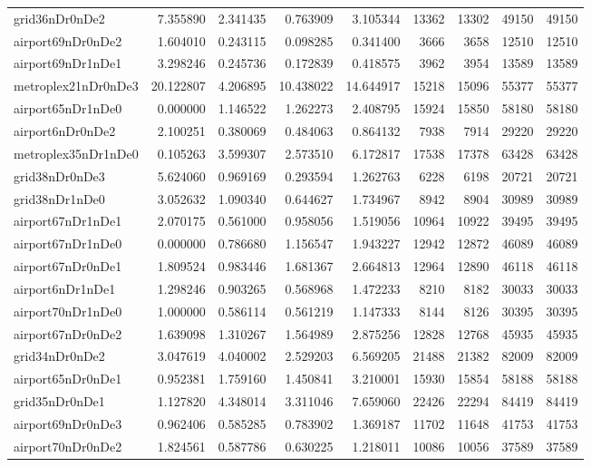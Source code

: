 \begin{longtable}{|l|r|r|r|r|r|r|r|r|}
grid36nDr0nDe2 & 7.355890 & 2.341435 & 0.763909 & 3.105344 & 13362 & 13302 & 49150 & 49150 \\
airport69nDr0nDe2 & 1.604010 & 0.243115 & 0.098285 & 0.341400 & 3666 & 3658 & 12510 & 12510 \\
airport69nDr1nDe1 & 3.298246 & 0.245736 & 0.172839 & 0.418575 & 3962 & 3954 & 13589 & 13589 \\
metroplex21nDr0nDe3 & 20.122807 & 4.206895 & 10.438022 & 14.644917 & 15218 & 15096 & 55377 & 55377 \\
airport65nDr1nDe0 & 0.000000 & 1.146522 & 1.262273 & 2.408795 & 15924 & 15850 & 58180 & 58180 \\
airport6nDr0nDe2 & 2.100251 & 0.380069 & 0.484063 & 0.864132 & 7938 & 7914 & 29220 & 29220 \\
metroplex35nDr1nDe0 & 0.105263 & 3.599307 & 2.573510 & 6.172817 & 17538 & 17378 & 63428 & 63428 \\
grid38nDr0nDe3 & 5.624060 & 0.969169 & 0.293594 & 1.262763 & 6228 & 6198 & 20721 & 20721 \\
grid38nDr1nDe0 & 3.052632 & 1.090340 & 0.644627 & 1.734967 & 8942 & 8904 & 30989 & 30989 \\
airport67nDr1nDe1 & 2.070175 & 0.561000 & 0.958056 & 1.519056 & 10964 & 10922 & 39495 & 39495 \\
airport67nDr1nDe0 & 0.000000 & 0.786680 & 1.156547 & 1.943227 & 12942 & 12872 & 46089 & 46089 \\
airport67nDr0nDe1 & 1.809524 & 0.983446 & 1.681367 & 2.664813 & 12964 & 12890 & 46118 & 46118 \\
airport6nDr1nDe1 & 1.298246 & 0.903265 & 0.568968 & 1.472233 & 8210 & 8182 & 30033 & 30033 \\
airport70nDr1nDe0 & 1.000000 & 0.586114 & 0.561219 & 1.147333 & 8144 & 8126 & 30395 & 30395 \\
airport67nDr0nDe2 & 1.639098 & 1.310267 & 1.564989 & 2.875256 & 12828 & 12768 & 45935 & 45935 \\
grid34nDr0nDe2 & 3.047619 & 4.040002 & 2.529203 & 6.569205 & 21488 & 21382 & 82009 & 82009 \\
airport65nDr0nDe1 & 0.952381 & 1.759160 & 1.450841 & 3.210001 & 15930 & 15854 & 58188 & 58188 \\
grid35nDr0nDe1 & 1.127820 & 4.348014 & 3.311046 & 7.659060 & 22426 & 22294 & 84419 & 84419 \\
airport69nDr0nDe3 & 0.962406 & 0.585285 & 0.783902 & 1.369187 & 11702 & 11648 & 41753 & 41753 \\
airport70nDr0nDe2 & 1.824561 & 0.587786 & 0.630225 & 1.218011 & 10086 & 10056 & 37589 & 37589 \\

\end{longtable}
